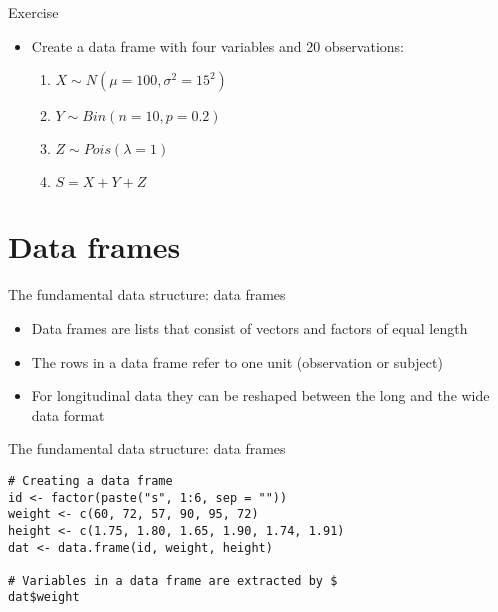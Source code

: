 \documentclass[aspectratio=169]{beamer}
\begin{document}
\begin{frame}{}
  \begin{block}{Exercise}
  \begin{itemize}
    \item Create a data frame with four variables and 20 observations:
      \begin{enumerate}
        \item $X \sim N(\mu=100, \sigma^2=15^2)$
        \item $Y \sim Bin(n=10, p=0.2)$
        \item $Z \sim Pois(\lambda=1)$
        \item $S = X + Y + Z$
      \end{enumerate}
  \end{itemize}
  \end{block}
\end{frame}

\section[Data frames]{Data frames}

\begin{frame}{The fundamental data structure: data frames}
  \begin{itemize}
    \item Data frames are lists that consist of vectors and factors of
      equal length
    \item The rows in a data frame refer to one unit (observation or
      subject)
    \item For longitudinal data they can be reshaped between the long and
      the wide data format
  \end{itemize}
  \vfill
\end{frame}

\begin{frame}[fragile]{The fundamental data structure: data frames}
\begin{lstlisting}
# Creating a data frame
id <- factor(paste("s", 1:6, sep = ""))
weight <- c(60, 72, 57, 90, 95, 72)
height <- c(1.75, 1.80, 1.65, 1.90, 1.74, 1.91)
dat <- data.frame(id, weight, height)

# Variables in a data frame are extracted by $
dat$weight
\end{lstlisting}
  \nocite{Venables2022}
\end{frame}
\end{document}

